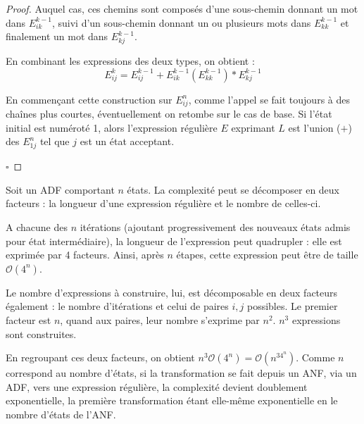 \begin{proof}
	Auquel cas, ces chemins sont composés d'une sous-chemin donnant un mot dans $E_{ik}^{k-1}$, suivi d'un sous-chemin donnant un ou plusieurs mots dans $E_{kk}^{k-1}$ et finalement un mot dans $E_{kj}^{k-1}$.
	
	En combinant les expressions des deux types, on obtient :
	$$
	E_{ij}^k = E_{ij}^{k-1}+E_{ik}^{k-1}(E_{kk}^{k-1})*E_{kj}^{k-1}
	$$
	
	En commençant cette construction sur $E_{ij}^n$, comme l'appel se fait toujours à des chaînes plus courtes, éventuellement on retombe sur le cas de base. Si l'état initial est numéroté 1, alors l'expression régulière $E$ exprimant $L$ est l'union ($+$) des $E_{1j}^n$ tel que $j$ est un état acceptant.
	
	\hfill$\square$
\end{proof}
\begin{complexity}
	Soit un ADF \automaton comportant $n$ états. La complexité peut se décomposer en deux facteurs : la longueur d'une expression régulière et le nombre de celles-ci.
	
	A chacune des $n$ itérations (ajoutant progressivement des nouveaux états admis pour état intermédiaire), la longueur de l'expression peut quadrupler : elle est exprimée par 4 facteurs. Ainsi, après $n$ étapes, cette expression peut être de taille $\mathcal{O}(4^n)$.
	
	Le nombre d'expressions à construire, lui, est décomposable en deux facteurs également : le nombre d'itérations et celui de paires $i,j$ possibles. Le premier facteur est $n$, quand aux paires, leur nombre s'exprime par $n^2$. $n^3$ expressions sont construites.
	
	En regroupant ces deux facteurs, on obtient $n^3\mathcal{O}(4^n)=\mathcal{O}(n^34^n)$. Comme $n$ correspond au nombre d'états, si la transformation se fait depuis un ANF, via un ADF, vers une expression régulière, la complexité devient doublement exponentielle, la première transformation étant elle-même exponentielle en le nombre d'états de l'ANF.	
\end{complexity}


